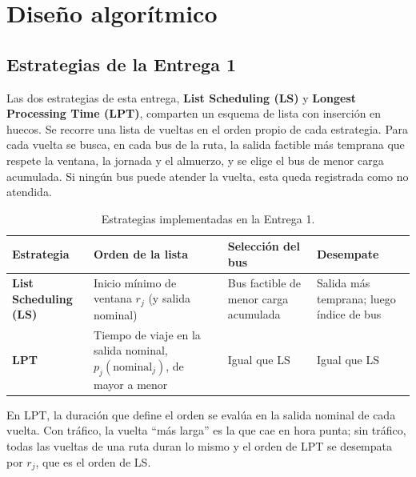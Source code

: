 \section{Diseño algorítmico}\label{sec:diseno}

\subsection{Estrategias de la Entrega 1}
Las dos estrategias de esta entrega, \textbf{List Scheduling (LS)} y \textbf{Longest Processing Time (LPT)}, comparten un esquema de lista con inserción en huecos. Se recorre una lista de vueltas en el orden propio de cada estrategia. Para cada vuelta se busca, en cada bus de la ruta, la salida factible más temprana que respete la ventana, la jornada y el almuerzo, y se elige el bus de menor carga acumulada. Si ningún bus puede atender la vuelta, esta queda registrada como no atendida.

\begin{table}[H]
\centering\small
\caption{Estrategias implementadas en la Entrega 1.}
\begin{tabularx}{\textwidth}{L{3.2cm}YL{3.2cm}L{3.0cm}}
\toprule
Estrategia & Orden de la lista & Selección del bus & Desempate \\
\midrule
\textbf{List Scheduling (LS)} & Inicio mínimo de ventana $r_j$ (y salida nominal) & Bus factible de menor carga acumulada & Salida más temprana; luego índice de bus \\
\textbf{LPT} & Tiempo de viaje en la salida nominal, $p_j(\text{nominal}_j)$, de mayor a menor & Igual que LS & Igual que LS \\
\bottomrule
\end{tabularx}
\end{table}

En LPT, la duración que define el orden se evalúa en la salida nominal de cada vuelta. Con tráfico, la vuelta ``más larga'' es la que cae en hora punta; sin tráfico, todas las vueltas de una ruta duran lo mismo y el orden de LPT se desempata por $r_j$, que es el orden de LS.

